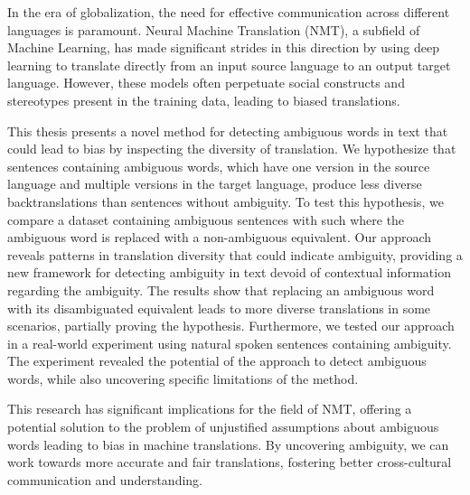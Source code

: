 \Abstract

In the era of globalization, the need for effective communication across different languages is paramount. Neural Machine Translation (NMT), a subfield of Machine Learning, has made significant strides in this direction by using deep learning to translate directly from an input source language to an output target language. 
However, these models often perpetuate social constructs and stereotypes present in the training data, leading to biased translations.

This thesis presents a novel method for detecting ambiguous words in text that could lead to bias by inspecting the diversity of translation. We hypothesize that sentences containing ambiguous words, which have one version in the source language and multiple versions in the target language, produce less diverse backtranslations than sentences without ambiguity. To test this hypothesis, we compare a dataset containing ambiguous sentences with such where the ambiguous word is replaced with a non-ambiguous equivalent.
Our approach reveals patterns in translation diversity that could indicate ambiguity, providing a new framework for detecting ambiguity in text devoid of contextual information regarding the ambiguity. The results show that replacing an ambiguous word with its disambiguated equivalent leads to more diverse translations in some scenarios, partially proving the hypothesis. 
Furthermore, we tested our approach in a real-world experiment using natural spoken sentences containing ambiguity. The experiment revealed the potential of the approach to detect ambiguous words, while also uncovering specific limitations of the method.

This research has significant implications for the field of NMT, offering a potential solution to the problem of unjustified assumptions about ambiguous words leading to bias in machine translations. By uncovering ambiguity, we can work towards more accurate and fair translations, fostering better cross-cultural communication and understanding.

